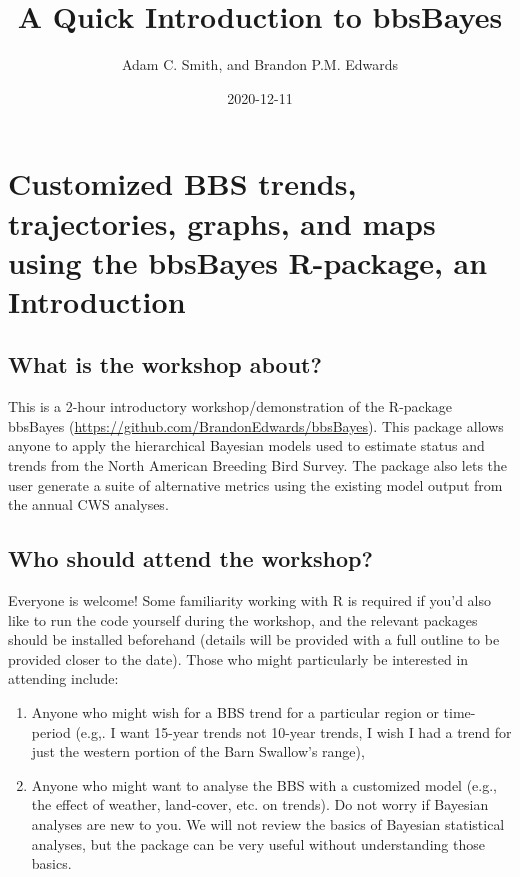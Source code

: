 \documentclass[
]{book}
\title{A Quick Introduction to bbsBayes}
\author{Adam C. Smith, and Brandon P.M. Edwards}
\date{2020-12-11}
\begin{document}
\maketitle

{
\setcounter{tocdepth}{1}
\tableofcontents
}
\hypertarget{customized-bbs-trends-trajectories-graphs-and-maps-using-the-bbsbayes-r-package-an-introduction}{%
\chapter{Customized BBS trends, trajectories, graphs, and maps using the bbsBayes R-package, an Introduction}\label{customized-bbs-trends-trajectories-graphs-and-maps-using-the-bbsbayes-r-package-an-introduction}}

\hypertarget{what-is-the-workshop-about}{%
\section{What is the workshop about?}\label{what-is-the-workshop-about}}

This is a 2-hour introductory workshop/demonstration of the R-package
bbsBayes (\url{https://github.com/BrandonEdwards/bbsBayes}). This package
allows anyone to apply the hierarchical Bayesian models used to estimate
status and trends from the North American Breeding Bird Survey. The
package also lets the user generate a suite of alternative metrics using
the existing model output from the annual CWS analyses.

\hypertarget{who-should-attend-the-workshop}{%
\section{Who should attend the workshop?}\label{who-should-attend-the-workshop}}

Everyone is welcome! Some familiarity working with R is required if
you'd also like to run the code yourself during the workshop, and the
relevant packages should be installed beforehand (details will be
provided with a full outline to be provided closer to the date). Those
who might particularly be interested in attending include:

\begin{enumerate}
\def\labelenumi{\arabic{enumi}.}
\item
  Anyone who might wish for a BBS trend for a particular region or
  time-period (e.g,. I want 15-year trends not 10-year trends, I wish
  I had a trend for just the western portion of the Barn Swallow's
  range),
\item
  Anyone who might want to analyse the BBS with a customized model
  (e.g., the effect of weather, land-cover, etc. on trends). Do not
  worry if Bayesian analyses are new to you. We will not review the
  basics of Bayesian statistical analyses, but the package can be very
  useful without understanding those basics.
\end{enumerate}
\end{document}
